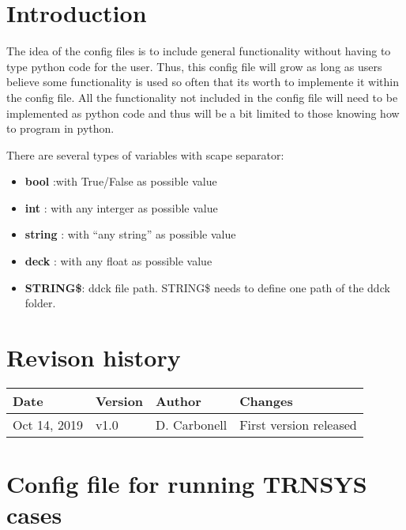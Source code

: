 \documentclass[english]{SPFReport}
\author{Dr. Daniel Carbonell}
\newcommand\Tstrut{\rule{0pt}{2.6ex}}         %
\newcommand\Bstrut{\rule[-0.9ex]{0pt}{0pt}}   %
\begin{document}
 


\section{Introduction}

The idea of the config files is to include general functionality without having to type python code for the user.
Thus, this config file will grow as long as users believe some functionality is used so often that its worth to implemente it within the config file. All the functionality not included in the config file will need to be implemented as python code and thus will be a bit limited to those knowing how to program in python. 

There are several types of variables with scape separator:
\begin{itemize}
\item \textbf{bool} :with True/False as possible value
\item \textbf{int} : with any interger as possible value
\item \textbf{string} : with ``any string'' as possible value
\item \textbf{deck} : with any float as possible value
\item \textbf{STRING\$}: ddck file path. STRING\$ needs to define one path of the ddck folder. 

\end{itemize}
\section{Revison history}


\begin{tabular}{| l |  l | l  | p{80mm} | }\hline

    \textbf{Date} & \textbf{Version} & \textbf{Author}&\textbf{Changes}  \\\hline
\Tstrut\Bstrut     Oct 14, 2019 & v1.0 & D. Carbonell&First version released \\\hline
  \end{tabular}

\section{Config file for running TRNSYS cases}

\end{document}
